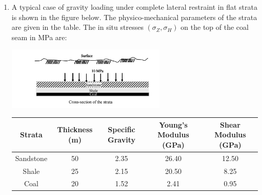 \documentclass[journal]{IEEEtran}
\begin{document}
\begin{enumerate}
\begin{enumerate}
\end{enumerate}

\item A typical case of gravity loading under complete lateral restraint in flat strata is shown in the figure below. The physico-mechanical parameters of the strata are given in the table. The in situ stresses $(\sigma_Z, \sigma_H)$ on the top of the coal seam in MPa are:

\begin{center}
\includegraphics[width=0.6\textwidth]{Screenshot_2025_0813_193403.png} 
\end{center}
\begin{table}[h!]
\centering
	\small{
\begin{tabular}{|c|c|c|c|c|}
\hline
\textbf{Strata} & \textbf{Thickness (m)} & \textbf{Specific Gravity} & \textbf{Young's  Modulus (GPa)} & \textbf{Shear Modulus (GPa)} \\
\hline
Sandstone & 50 & 2.35 & 26.40 & 12.50 \\
\hline
Shale & 25 & 2.15 & 20.50 & 8.25 \\
\hline
Coal & 20 & 1.52 & 2.41 & 0.95 \\
\hline

\end{tabular}
} 
\end{table}
\begin{enumerate}
\end{enumerate}



\end{enumerate}
\end{document}
